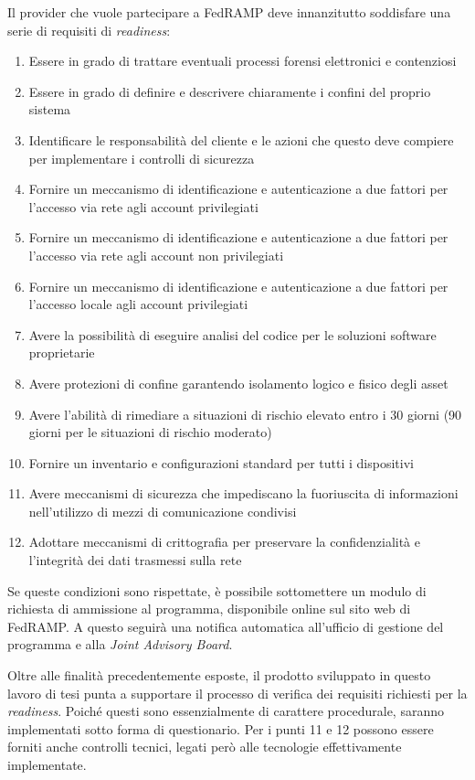 \documentclass[../main.tex]{subfiles}
\begin{document}
Il provider che vuole partecipare a FedRAMP deve innanzitutto soddisfare una serie di requisiti di \textit{readiness}:
\begin{enumerate}
    \item Essere in grado di trattare eventuali processi forensi elettronici e contenziosi 
    \item Essere in grado di definire e descrivere chiaramente i confini del proprio sistema
    \item Identificare le responsabilità del cliente e le azioni che questo deve compiere per implementare i controlli di sicurezza
    \item Fornire un meccanismo di identificazione e autenticazione a due fattori per l'accesso via rete agli account privilegiati
    \item Fornire un meccanismo di identificazione e autenticazione a due fattori per l'accesso via rete agli account non privilegiati
    \item Fornire un meccanismo di identificazione e autenticazione a due fattori per l'accesso locale agli account privilegiati
    \item Avere la possibilità di eseguire analisi del codice per le soluzioni software proprietarie
    \item Avere protezioni di confine garantendo isolamento logico e fisico degli asset
    \item Avere l'abilità di rimediare a situazioni di rischio elevato entro i 30 giorni (90 giorni per le situazioni di rischio moderato)
    \item Fornire un inventario e configurazioni standard per tutti i dispositivi
    \item Avere meccanismi di sicurezza che impediscano la fuoriuscita di informazioni nell'utilizzo di mezzi di comunicazione condivisi
    \item Adottare meccanismi di crittografia per preservare la confidenzialità e l'integrità dei dati trasmessi sulla rete
\end{enumerate}


Se queste condizioni sono rispettate, è possibile sottomettere un modulo di richiesta di ammissione al programma, disponibile online sul sito web di FedRAMP. A questo seguirà una notifica automatica all'ufficio di gestione del programma e alla \textit{Joint Advisory Board}.


Oltre alle finalità precedentemente esposte, il prodotto sviluppato in questo lavoro di tesi punta a supportare il processo di verifica dei requisiti richiesti per la \textit{readiness}. Poiché questi sono essenzialmente di carattere procedurale, saranno implementati sotto forma di questionario.
Per i punti 11 e 12 possono essere forniti anche controlli tecnici, legati però alle tecnologie effettivamente implementate.
\end{document}
